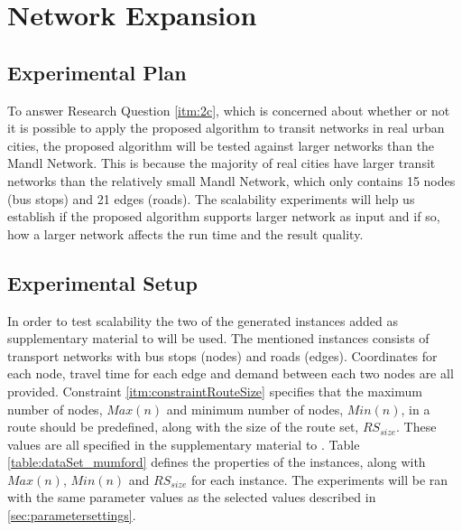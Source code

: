 \section{Network Expansion}

\subsection{Experimental Plan}
To answer Research Question \vref{itm:2c}, which is concerned about whether or not it is possible to apply the proposed algorithm to transit networks in real urban cities, the proposed algorithm will be tested against larger networks than the Mandl Network. This is because the majority of real cities have larger transit networks than the relatively small Mandl Network, which only contains 15 nodes (bus stops) and 21 edges (roads). The scalability experiments will help us establish if the proposed algorithm supports larger network as input and if so, how a larger network affects the run time and the result quality.


\subsection{Experimental Setup}
\label{subsec:scalabilityExperiments_setup}

In order to test scalability the two of the generated instances added as supplementary material to \citet{mumford13} will be used. The mentioned instances consists of transport networks with bus stops (nodes) and roads (edges). Coordinates for each node, travel time for each edge and demand between each two nodes are all provided. Constraint \vref{itm:constraintRouteSize} specifies that the maximum number of nodes, $Max(n)$ and minimum number of nodes, $Min(n)$, in a route should be predefined, along with the size of the route set, $RS_{size}$. These values are all specified in the supplementary material to \citet{mumford13}. Table \vref{table:dataSet_mumford} defines the properties of the instances, along with $Max(n)$, $Min(n)$ and $RS_{size}$ for each instance. The experiments will be ran with the same parameter values as the selected values described in \vref{sec:parametersettings}.

